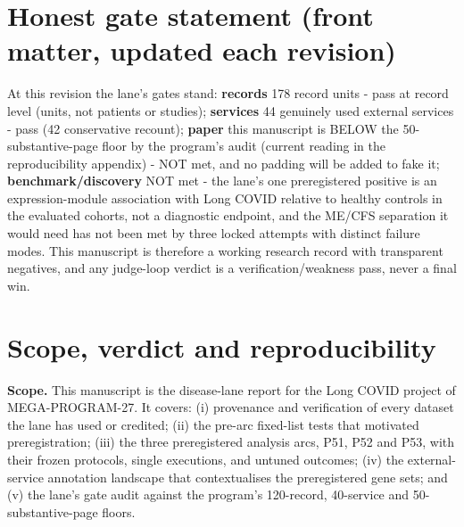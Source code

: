 \documentclass[11pt,a4paper]{article}
\begin{document}
\begin{abstract}
two-sided training threshold, but the module composites inter-correlate at
0.87-0.98, consistent with one shared transcriptional axis rather than nine
independent signals. The selected cfRNA signature fails transport to cellular
ME/CFS on GSE275334 (E1: $p=.90$) and shows an oppositely directed cellular
ME/CFS-vs-Long-COVID contrast (E2: $p=.0126$, $g=-0.929$); the mechanism of
this directional discordance is unresolved. The P53 win rule is not met. The
three arcs are three distinct attempts with different failure modes, not
three tests of one hypothesis. We build the lane's gate evidence honestly:
178 accession-backed record units, 44 genuinely used external scientific
services, and this manuscript toward the 50-substantive-page gate, whose
status is stated exactly wherever it stands. No clinical test, named
discovery, or benchmark break is claimed.
\end{abstract}
\tableofcontents\clearpage

\section*{Honest gate statement (front matter, updated each revision)}
At this revision the lane's gates stand: \textbf{records} 178 record units -
pass at record level (units, not patients or studies); \textbf{services} 44
genuinely used external services - pass (42 conservative recount);
\textbf{paper} this manuscript is BELOW the 50-substantive-page floor by the
program's audit (current reading in the reproducibility appendix) - NOT met,
and no padding will be added to fake it; \textbf{benchmark/discovery} NOT met
- the lane's one preregistered positive is an expression-module association
with Long COVID relative to healthy controls in the evaluated cohorts, not a
diagnostic endpoint, and the ME/CFS separation it would need has not been met
by three locked attempts with distinct failure modes. This manuscript is therefore a working research record with
transparent negatives, and any judge-loop verdict is a verification/weakness
pass, never a final win.


\section{Scope, verdict and reproducibility}
\textbf{Scope.} This manuscript is the disease-lane report for the Long COVID
project of MEGA-PROGRAM-27. It covers: (i) provenance and verification of every
dataset the lane has used or credited; (ii) the pre-arc fixed-list tests that
motivated preregistration; (iii) the three preregistered analysis arcs, P51, P52
and P53, with their frozen protocols, single executions, and untuned
outcomes;
(iv) the external-service annotation landscape that contextualises the
preregistered gene sets; and (v) the lane's gate audit against the program's
120-record, 40-service and 50-substantive-page floors.
\end{document}
